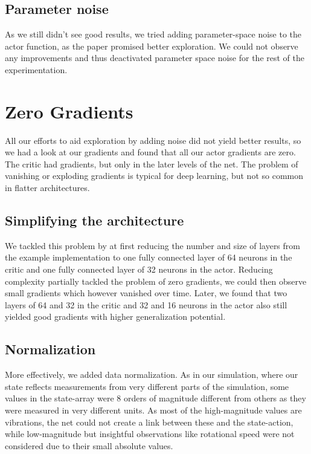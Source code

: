 \documentclass[hyperref,german,beleg]{cgvpub}
\begin{document}
\subsection{Parameter noise}

As we still didn't see good results, we tried adding parameter-space noise \cite{plappertParameterSpaceNoise2017} to the actor function, as the paper promised better exploration. We could not observe any improvements and thus deactivated parameter space noise for the rest of the experimentation.

\section{Zero Gradients}
All our efforts to aid exploration by adding noise did not yield better results, so we had a look at our gradients and found that all our actor gradients are zero. The critic had gradients, but only in the later levels of the net. The problem of vanishing or exploding gradients is typical for deep learning, but not so common in flatter architectures.

\subsection{Simplifying the architecture}

We tackled this problem by at first reducing the number and size of layers from the example implementation to one fully connected layer of 64 neurons in the critic and one fully connected layer of 32 neurons in the actor. Reducing complexity partially tackled the problem of zero gradients, we could then observe small gradients which however vanished over time. Later, we found that two layers of 64 and 32 in the critic and 32 and 16 neurons in the actor also still yielded good gradients with higher generalization potential.

\subsection{Normalization}

More effectively, we added data normalization. As in our simulation, where our state reflects measurements from very different parts of the simulation, some values in the state-array were 8 orders of magnitude different from others as they were measured in very different units. As most of the high-magnitude values are vibrations, the net could not create a link between these and the state-action, while low-magnitude but insightful observations like rotational speed were not considered due to their small absolute values. 
\end{document}
